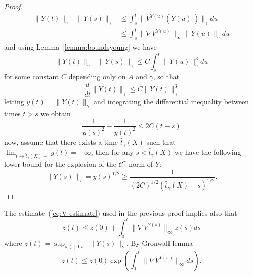 \documentclass[a4paper,12pt,reqno]{amsart}
\newcommand{\CC}{\mathscr{C}}
\begin{document}
\begin{proof}
\begin{equation}
\label{eq:V-estimate}
  \begin{split}
\|Y(t)\|_\gamma - \|Y(s)\|_\gamma & \le \int_s^t
\|V^{Y(u)}(Y(u)_\cdot)\|_\gamma du
\\ &      \le \int_s^t \|\nabla V^{Y(u)}\|_\infty
\|Y(u)\|_\gamma du
  \end{split}
\end{equation}
and using Lemma~\ref{lemma:boundsyoung} we have
\begin{equation*}
\|Y(t)\|_\gamma - \|Y(s)\|_\gamma
   \le C \int_s^t \|Y(u)\|^3_\gamma du
\end{equation*}
for some constant $C$ depending only on $A$ and $\gamma$, so that
\begin{equation*}
\frac{d}{dt} \|Y(t)\|_\gamma     \le  C\|Y(t)\|^3_\gamma
\end{equation*}
letting $y(t) = \|Y(t)\|_{\gamma}$ and integrating the
differential inequality between times $t>s$ we obtain
$$
\frac{1}{y(s)^2}-\frac{1}{y(t)^2} \le 2 C  (t-s)
$$
now, assume that there exists a time $\hat{t}_\gamma(X)$ such that $\lim_{t\to
  \hat t_\gamma(X) -} y(t) = +\infty$, then for any $s < \hat{t}_\gamma(X)$ we have the
following lower bound for the explosion of the $\CC^\gamma$ norm of $Y$:
$$
\|Y(s)\|_{\gamma} = y(s)^{1/2} \ge \frac{1}{(2C)^{1/2} (\hat t_\gamma(X) - s)^{1/2}}.
$$
\end{proof}

The estimate~(\ref{eq:V-estimate}) used in the previous proof implies
also that
\begin{equation}
  \label{eq:V-estimate2}
 z(t) \le z(0) + \int_0^t \|\nabla V^{Y(s)}\|_\infty z(s)ds
\end{equation}
where  $z(t) = \sup_{s\in[0,t]}\|Y(s)\|_\gamma$.
By Gronwall lemma
$$
z(t) \le z(0) \exp\left(\int_0^t \|\nabla V^{Y(s)}\|_\infty ds \right)
.
$$
\end{document}
